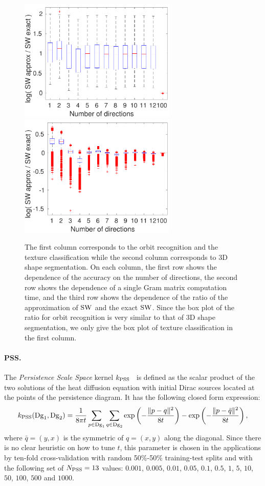 \begin{figure}
\includegraphics[width=7.5cm]{figures/ratiooutex.pdf}\ \ \includegraphics[width=7.5cm]{figures/ratioprinceton.pdf}
\caption[Accuracy and training time dependences on direction number]{\label{fig:plots} The first column corresponds to the orbit recognition and the texture classification while the second
column corresponds to 3D shape segmentation. 
On each column, the first row shows the dependence of the accuracy on the number of directions,
the second row shows the dependence of a single Gram matrix computation time, and the third row
shows the dependence of the ratio of the approximation of ${\rm SW}$ and the exact ${\rm SW}$.
Since the box plot of the ratio for orbit recognition is very similar to that of 3D shape segmentation,
we only give the box plot of texture classification in the first column. }
\end{figure}


\paragraph*{PSS.} The {\em Persistence Scale Space} kernel $k_{\rm PSS}$~\cite{Reininghaus15} is
defined as the scalar product of the two solutions of the heat diffusion equation
with initial Dirac sources located at the points of the persistence diagram. It has the following closed form expression:
$$k_{\rm PSS}(\mathrm{Dg}_1,\mathrm{Dg}_2)=\frac{1}{8\pi t}\sum_{p\in \mathrm{Dg}_1}\sum_{q\in \mathrm{Dg}_2} {\rm exp}\left(-\frac{\|p-q\|^2}{8t}\right) 
- {\rm exp}\left(-\frac{\|p-\bar q\|^2}{8t}\right),$$
where $\bar q=(y,x)$ is the symmetric of $q=(x,y)$ along the diagonal.
Since there is no clear heuristic on how to tune $t$, this parameter is chosen in the applications 
by ten-fold cross-validation with random 50\%-50\%
training-test splits and with the following set of $N_{\rm PSS}=13$ values: $0.001$, $0.005$, $0.01$, $0.05$, 
$0.1$, $0.5$, $1$, $5$, $10$, $50$, $100$, $500$ and $1000$. 

